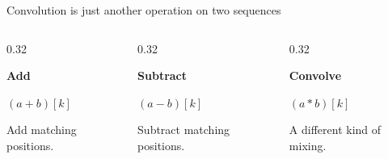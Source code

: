 \documentclass[aspectratio=169,11pt]{beamer}
\newcommand{\CardTitleSize}{\large}
\newcommand{\CardTitle}[1]{%
  \vspace{0.15cm}
  {\CardTitleSize\bfseries #1}\par
}
\begin{document}
\begin{frame}{Convolution is just another operation on two sequences}
\begin{columns}[T,totalwidth=\textwidth]
\begin{column}{0.32\textwidth}
\begin{BlueCard}[halign=center,top=10pt,bottom=10pt]
\CardTitle{Add}

\vspace{0.02cm}

{\Large\(\displaystyle (a+b)[k]\)\par}

\vspace{0.06cm}

{\normalsize
Add matching positions.
}
\end{BlueCard}
\end{column}

\begin{column}{0.32\textwidth}
\begin{OrangeCard}[halign=center,top=10pt,bottom=10pt]
\CardTitle{Subtract}

\vspace{0.02cm}

{\Large\(\displaystyle (a-b)[k]\)\par}

\vspace{0.06cm}

{\normalsize
Subtract matching positions.
}
\end{OrangeCard}
\end{column}

\begin{column}{0.32\textwidth}
\begin{GreenCard}[halign=center,top=10pt,bottom=10pt]
\CardTitle{Convolve}

\vspace{0.02cm}

{\Large\(\displaystyle (a*b)[k]\)\par}

\vspace{0.06cm}

{\normalsize
A different kind of mixing.
}
\end{GreenCard}
\end{column}

\end{columns}






\end{frame}
\end{document}
